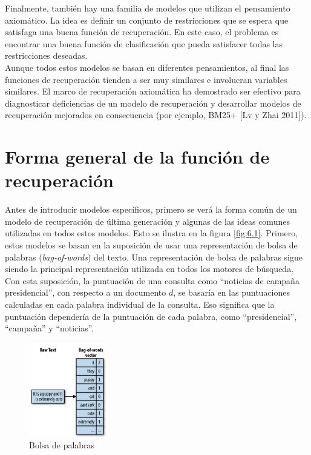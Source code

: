 Finalmente, también hay una familia de modelos que utilizan el pensamiento axiomático. La idea es definir un conjunto de restricciones que se espera que satisfaga una buena función de recuperación. En este caso, el problema es encontrar una buena función de clasificación que pueda satisfacer todas las restricciones deseadas. \\

Aunque todos estos modelos se basan en diferentes pensamientos, al final las funciones de recuperación tienden a ser muy similares e involucran variables similares. El marco de recuperación axiomática ha demostrado ser efectivo para diagnosticar deficiencias de un modelo de recuperación y desarrollar modelos de recuperación mejorados en consecuencia (por ejemplo, BM25+ [Lv y Zhai 2011]).

\section{Forma general de la función de recuperación}

Antes de introducir modelos específicos, primero se verá la forma común de un modelo de recuperación de última generación y algunas de las ideas comunes utilizadas en todos estos modelos. Esto se ilustra en la figura \ref{fig:6.1}. Primero, estos modelos se basan en la suposición de usar una representación de bolsa de palabras (\textit{bag-of-words}) del texto. Una representación de bolsa de palabras sigue siendo la principal representación utilizada en todos los motores de búsqueda. Con esta suposición, la puntuación de una consulta como ``noticias de campaña presidencial'', con respecto a un documento $d$, se basaría en las puntuaciones calculadas en cada palabra individual de la consulta. Eso significa que la puntuación dependería de la puntuación de cada palabra, como ``presidencial'', ``campaña'' y ``noticias''. \\

\begin{figure}[h]
\centering
\includegraphics[width=0.3\textwidth]{fotos/15.png}
\caption{Bolsa de palabras}
\label{fig:6.0}
\end{figure}



